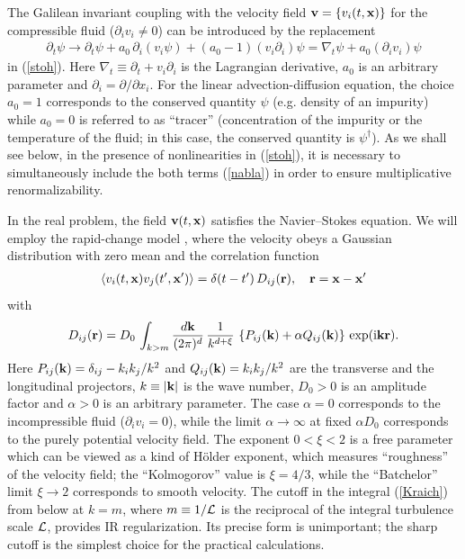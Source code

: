 \documentclass[12pt]{article}
\def\bfr{{\bf r}}
\def\bfx{{\bf x}}
\begin{document}
The Galilean invariant coupling with the velocity field
${\bf v}= \{ v_{i}(t,\bfx) \}$ for the compressible fluid
($\partial _i v_{i} \ne 0$) can be introduced by the replacement
\begin{eqnarray}
\partial_{t}\psi \to \partial_{t}\psi + a_{0}\, \partial_{i}(v_{i}\psi) +
(a_{0}-1) (v_{i} \partial_{i})\psi =
\nabla_{t} \psi + a_{0}(\partial_{i}v_{i}) \psi
\label{nabla}
\end{eqnarray}
in (\ref{stoh}). Here $\nabla_{t} \equiv \partial_{t} + v_{i} \partial_{i}$
is the Lagrangian derivative, $a_{0}$ is an arbitrary parameter and
$\partial_i = \partial /\partial x_{i}$. For the linear advection-diffusion
equation, the choice $a_{0}=1$ corresponds to the conserved quantity $\psi$
(e.g. density of an impurity) while $a_{0}=0$ is referred to as ``tracer''
(concentration of the impurity or the temperature of the fluid; in this
case, the conserved quantity is $\psi^{\dag}$).
As we shall see below, in the presence of nonlinearities in (\ref{stoh}),
it is necessary to simultaneously include the both terms (\ref{nabla}) in
order to ensure multiplicative renormalizability.


In the real problem, the field ${\bf v}(t,{\bf x})$ satisfies the
Navier--Stokes equation. We will employ the rapid-change model \cite{FGV},
where the velocity obeys a Gaussian distribution with zero mean and
the correlation function
\begin{eqnarray}
\langle v_{i}(t, \bfx) v_{j}(t',{\bf x'})\rangle =  \delta(t-t')\,
D_{ij}(\bfr), \quad \bfr = \bfx-{\bf x'}
\label{white}
\end{eqnarray}
with
\begin{eqnarray}
D_{ij}(\bfr) = D_{0}\, \int_{k>m} \frac{d{\bf k}}{(2\pi)^{d}} \,
\frac{1}{k^{d+\xi}}\, \left\{ P_{ij}({\bf k})+\alpha Q_{ij}({\bf
k}) \right\}\, \exp ({\rm i} {\bf kr} ).
\label{Kraich}
\end{eqnarray}
Here $P_{ij}({\bf k}) = \delta_{ij} - k_i k_j / k^2$ and
$Q_{ij}({\bf k})=k_i k_j/k^2$ are the transverse and the longitudinal
projectors, $k\equiv |{\bf k}|$ is the wave number,
$D_{0}>0$ is an amplitude factor and $\alpha>0$ is an arbitrary
parameter. The case $\alpha=0$ corresponds to the incompressible fluid
($\partial _i v_{i}=0$), while the limit $\alpha \to\infty$ at fixed
$\alpha D_{0}$ corresponds to the purely potential velocity field.
The exponent $0<\xi<2$ is a free parameter which can be viewed as a kind
of H\"{o}lder exponent, which measures ``roughness'' of the velocity field;
the ``Kolmogorov'' value is $\xi=4/3$, while the ``Batchelor'' limit
$\xi\to2$ corresponds to smooth velocity. The cutoff in the
integral (\ref{Kraich}) from below at $k=m$, where $m\equiv 1/{\cal L}$ is
the reciprocal of the integral turbulence scale ${\cal L}$, provides IR
regularization. Its precise form is unimportant; the sharp cutoff is the
simplest choice for the practical calculations.
\end{document}
